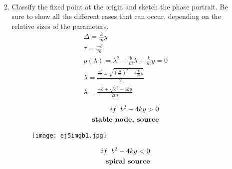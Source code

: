 \documentclass[a4paper,10pt]{article}
\begin{document}
\begin{enumerate}
\begin{enumerate}
\begin{equation}
\begin{aligned}
                    \end{aligned}
                \end{equation}
            
            
            \item Classify the fixed point at the origin and sketch the phase portrait. Be sure to show all the different cases that can occur, depending on the relative sizes of the parameters.
                \begin{equation}
                    \begin{aligned}
                        \Delta= \frac{k}{m}y\\
                        \tau= \frac{-b}{m}\\
                        p(\lambda)=\lambda^{2}+ \frac{b}{m}\lambda +\frac{k}{m}y=0\\
                        \lambda= \frac{\frac{-b}{m}\pm\sqrt{(\frac{b}{m})^{2}-4\frac{k}{m}y}}{2}\\
                        \lambda= \frac{-b\pm\sqrt{b^{2}-4ky}}{2m}\\
                    \end{aligned}
                \end{equation}
                \begin{equation}
                    \begin{aligned}
                        if\hspace{0.2cm} b^{2}-4ky > 0\\
                        \textbf{stable node, source}
                    \end{aligned}
                \end{equation}
                \newpage
                \begin{figure}[h]
                    \centering
                    \texttt{[image: ej5imgb1.jpg]}
                    \label{fig:mesh1}
                \end{figure}
                \begin{equation}
                    \begin{aligned}
                        if\hspace{0.2cm} b^{2}-4ky < 0\\
                        \textbf{spiral source}
                    \end{aligned}
                \end{equation}
                \newpage
                \begin{figure}[h]

\end{figure}
\end{enumerate}
\end{enumerate}
\end{document}
